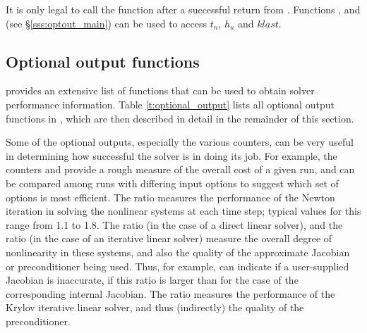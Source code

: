 {{}
{
  It is only legal to call the function  after a 
  successful return from . Functions ,
   and  (see \S\ref{sss:optout_main})
  can be used to access $t_n$, $h_u$ and $klast$.
}


\subsection{Optional output functions}\label{ss:optional_output}

{\idas} provides an extensive list of functions that can be used to obtain
solver performance information.  Table \ref{t:optional_output} lists all optional
output functions in {\idas}, which are then described in detail in the remainder
of this section.

Some of the optional outputs, especially the various counters, can be
very useful in determining how successful the {\idas} solver is in
doing its job.  For example, the counters  and 
provide a rough measure of the overall cost of a given run, and can be
compared among runs with differing input options to suggest which set
of options is most efficient.  The ratio  measures
the performance of the Newton iteration in solving the nonlinear
systems at each time step; typical values for this range from 1.1 to
1.8.  The ratio  (in the case of a direct linear
solver), and the ratio  (in the case of an
iterative linear solver) measure the overall degree of nonlinearity
in these systems, and also the quality of the approximate Jacobian or
preconditioner being used.  Thus, for example, 
can indicate if a user-supplied Jacobian is inaccurate, if this ratio
is larger than for the case of the corresponding internal Jacobian.
The ratio  measures the performance of the Krylov
iterative linear solver, and thus (indirectly) the quality of the
preconditioner.

\vspace*{.2in}

\newlength{\colAA}
\settowidth{\colAA}{No. of residual calls for finite diff. Jacobian-vector evals.}
\newlength{\colBB}

}
